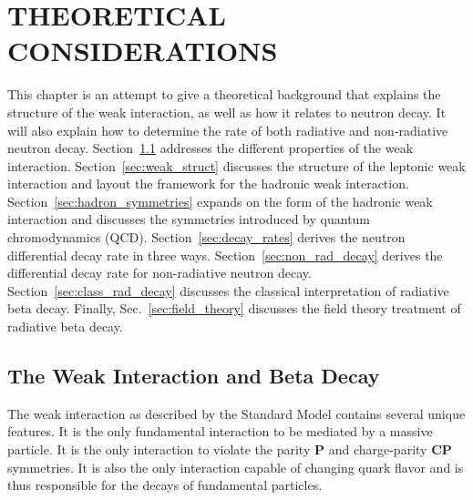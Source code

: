 \documentclass[oneside,12pt]{memoir}
\begin{document}
\chapter{THEORETICAL CONSIDERATIONS}
\label{ch:theory}
This chapter is an attempt to give a theoretical background that explains the structure of the weak interaction, as well as how it relates to neutron decay. It will also explain how to determine the rate of both radiative and non-radiative neutron decay. Section~\ref{sec:weak_int} addresses the different properties of the weak interaction. Section~\ref{sec:weak_struct} discusses the structure of the leptonic weak interaction and layout the framework for the hadronic weak interaction. Section~\ref{sec:hadron_symmetries} expands on the form of the hadronic weak interaction and discusses the symmetries introduced by quantum chromodynamics (QCD). Section~\ref{sec:decay_rates} derives the neutron differential decay rate in three ways. Section~\ref{sec:non_rad_decay} derives the differential decay rate for non-radiative neutron decay. Section~\ref{sec:class_rad_decay} discusses the classical interpretation of radiative beta decay. Finally, Sec.~\ref{sec:field_theory} discusses the field theory treatment of radiative beta decay.

\section{The Weak Interaction and Beta Decay}
\label{sec:weak_int}
The weak interaction as described by the Standard Model contains several unique features. It is the only fundamental interaction to be mediated by a massive particle. It is the only interaction to violate the parity $\mathbf{P}$ and charge-parity $\mathbf{CP}$ symmetries. It is also the only interaction capable of changing quark flavor and is thus responsible for the decays of fundamental particles.
\end{document}
